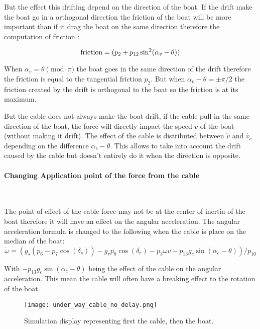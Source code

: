 But the effect this drifting depend on the direction of the boat.
If the drift make the boat go in a orthogonal direction the friction of the boat will be more important than if it
drag the boat on the same direction therefore the computation of friction :

\begin{equation}
\textnormal{friction} = (p_2+p_{12} \sin^2(\alpha_v-\theta))
\end{equation}

When $\alpha_v = \theta \pmod{\pi}$ the boat goes in the same direction of the drift therefore the friction is equal to the tangential friction $p_2$. But when $\alpha_v -\theta =\pm \pi/2$ the friction created by the drift is orthogonal to the boat so the friction is at its maximum.

But the cable does not always make the boat drift, if the cable pull in the same direction of the boat, the force will directly impact the speed  $v$ of the boat (without making it drift). The effect of the cable is distributed between $\dot{v}$ and $\dot{v_c}$ depending on the difference $\alpha_c -\theta$. This allows to take into account the drift caused by the cable but doesn't entirely do it when the direction is opposite.

\paragraph*{Changing Application point of the force from the cable}
~\\
\vskip1mm
\hskip7mm
 
The point of effect of the cable force may not be at the center of inertia of the boat therefore it will
have an effect on the angular acceleration. The angular acceleration formula is changed to the following  when
the cable is place on the median of the boat:
\begin{equation}
\dot{\omega} =
(g_s(p_6-p_7\cos(\delta_s))-g_r p_8 \cos(\delta_r)-p_3 \omega v -p_{13} g_c \sin(\alpha_c-\theta))/p_{10}
\end{equation}

With $-p_{13} g_c \sin(\alpha_c-\theta)$ being the effect of the cable on the angular acceleration.
This mean the cable will often have a breaking effect to the rotation of the boat.

\begin{figure}[H]
\centering
    \texttt{[image: under\_way\_cable\_no\_delay.png]}
    \caption{Simulation display representing first the cable, then the boat.}
    \label{fig:3wayBoat}
\end{figure}

